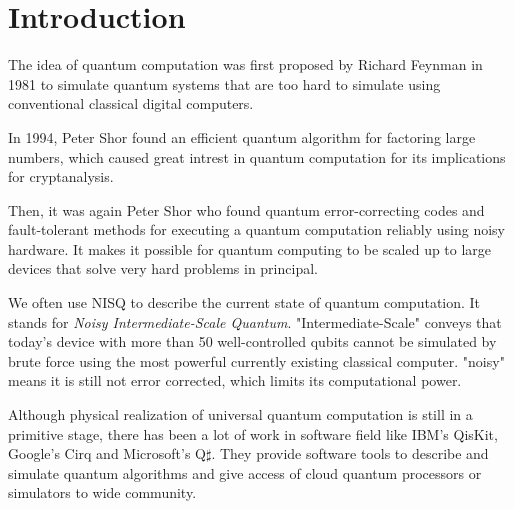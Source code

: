 \section{Introduction}
The idea of quantum computation was first proposed by Richard Feynman in 1981 to simulate quantum systems that are too hard to simulate using conventional classical digital computers.

In 1994, Peter Shor found an efficient quantum algorithm for factoring large numbers, which caused great intrest in quantum computation for its implications for cryptanalysis.

Then, it was again Peter Shor who found quantum error-correcting codes and fault-tolerant methods for executing a quantum computation reliably using noisy hardware. It makes it possible for quantum computing to be scaled up to large devices that solve very hard problems in principal.

We often use NISQ to describe the current state of quantum computation. It stands for \textit{Noisy Intermediate-Scale Quantum}. "Intermediate-Scale" conveys that today's device with more than 50 well-controlled qubits cannot be simulated by brute force using the most powerful currently existing classical computer.
"noisy" means it is still not error corrected, which limits its computational power.



Although physical realization of universal quantum computation is still in a primitive stage, there has been a lot of work in software field like IBM's QisKit, Google's Cirq and Microsoft's Q$\sharp$.
They provide software tools to describe and simulate quantum algorithms and give access of cloud quantum processors or simulators to wide community.

